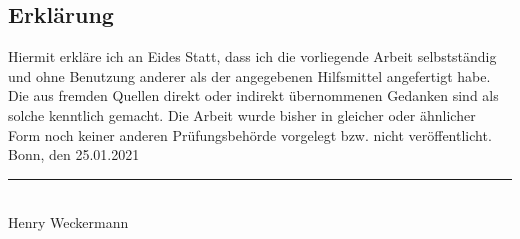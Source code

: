 \documentclass[a4paper]{book}
\def\autor{Henry Weckermann}
\begin{document}
\begin{large}

\section*{Erklärung}

Hiermit erkläre ich an Eides Statt, dass ich die vorliegende Arbeit
selbstständig und ohne Benutzung anderer als der angegebenen
Hilfsmittel angefertigt habe. Die aus fremden Quellen direkt oder
indirekt übernommenen Gedanken sind als solche kenntlich gemacht.  Die
Arbeit wurde bisher in gleicher oder ähnlicher Form noch keiner
anderen Prüfungsbehörde vorgelegt bzw. nicht veröffentlicht.\\

\vspace{1cm}
\noindent
Bonn, den 25.01.2021
\vspace{2cm}

\noindent
\rule{10cm}{0.1mm} \\
\autor\




\clearpage

\end{large}
\end{document}
